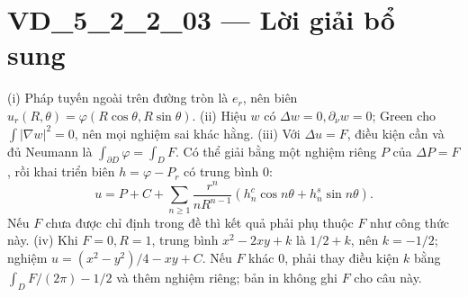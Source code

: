 \documentclass[10pt,a4paper]{article}
\begin{document}
\section*{VD\_5\_2\_2\_03 — Lời giải bổ sung}
(i) Pháp tuyến ngoài trên đường tròn là $e_r$, nên biên $u_r(R,\theta)=\varphi(R\cos\theta,R\sin\theta)$.
(ii) Hiệu $w$ có $\Delta w=0,\partial_\nu w=0$; Green cho $\int|\nabla w|^2=0$, nên mọi nghiệm sai khác hằng.
(iii) Với $\Delta u=F$, điều kiện cần và đủ Neumann là $\int_{\partial D}\varphi=\int_DF$. Có thể giải bằng một nghiệm riêng $P$ của $\Delta P=F$, rồi khai triển biên $h=\varphi-P_r$ có trung bình 0:
\[u=P+C+\sum_{n\ge1}\frac{r^n}{nR^{n-1}}(h_n^c\cos n\theta+h_n^s\sin n\theta).\]
Nếu $F$ chưa được chỉ định trong đề thì kết quả phải phụ thuộc $F$ như công thức này.
(iv) Khi $F=0,R=1$, trung bình $x^2-2xy+k$ là $1/2+k$, nên $k=-1/2$; nghiệm $u=(x^2-y^2)/4-xy+C$. Nếu $F$ khác 0, phải thay điều kiện $k$ bằng $\int_DF/(2\pi)-1/2$ và thêm nghiệm riêng; bản in không ghi $F$ cho câu này.
\end{document}
